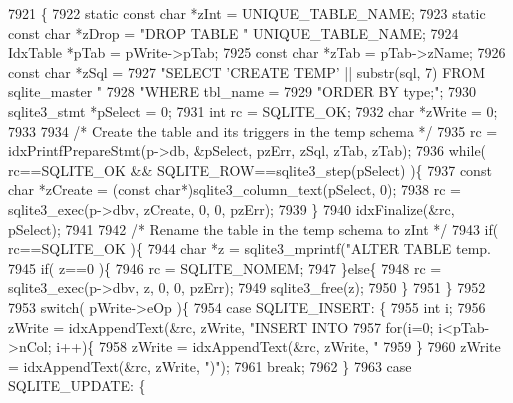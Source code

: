 \begin{DoxyCode}
7921  \{
7922   \textcolor{keyword}{static} \textcolor{keyword}{const} \textcolor{keywordtype}{char} *zInt = UNIQUE_TABLE_NAME;
7923   \textcolor{keyword}{static} \textcolor{keyword}{const} \textcolor{keywordtype}{char} *zDrop = \textcolor{stringliteral}{"DROP TABLE "} UNIQUE_TABLE_NAME;
7924   IdxTable *pTab = pWrite->pTab;
7925   \textcolor{keyword}{const} \textcolor{keywordtype}{char} *zTab = pTab->zName;
7926   \textcolor{keyword}{const} \textcolor{keywordtype}{char} *zSql = 
7927     \textcolor{stringliteral}{"SELECT 'CREATE TEMP' || substr(sql, 7) FROM sqlite\_master "}
7928     \textcolor{stringliteral}{"WHERE tbl\_name = %
7929     \textcolor{stringliteral}{"ORDER BY type;"};
7930   sqlite3_stmt *pSelect = 0;
7931   \textcolor{keywordtype}{int} rc = SQLITE_OK;
7932   \textcolor{keywordtype}{char} *zWrite = 0;
7933 
7934   \textcolor{comment}{/* Create the table and its triggers in the temp schema */}
7935   rc = idxPrintfPrepareStmt(p->db, &pSelect, pzErr, zSql, zTab, zTab);
7936   \textcolor{keywordflow}{while}( rc==SQLITE_OK && SQLITE_ROW==sqlite3_step(pSelect) )\{
7937     \textcolor{keyword}{const} \textcolor{keywordtype}{char} *zCreate = (\textcolor{keyword}{const} \textcolor{keywordtype}{char}*)sqlite3_column_text(pSelect, 0);
7938     rc = sqlite3_exec(p->dbv, zCreate, 0, 0, pzErr);
7939   \}
7940   idxFinalize(&rc, pSelect);
7941 
7942   \textcolor{comment}{/* Rename the table in the temp schema to zInt */}
7943   \textcolor{keywordflow}{if}( rc==SQLITE_OK )\{
7944     \textcolor{keywordtype}{char} *z = sqlite3_mprintf(\textcolor{stringliteral}{"ALTER TABLE temp.%
7945     \textcolor{keywordflow}{if}( z==0 )\{
7946       rc = SQLITE_NOMEM;
7947     \}\textcolor{keywordflow}{else}\{
7948       rc = sqlite3_exec(p->dbv, z, 0, 0, pzErr);
7949       sqlite3_free(z);
7950     \}
7951   \}
7952 
7953   \textcolor{keywordflow}{switch}( pWrite->eOp )\{
7954     \textcolor{keywordflow}{case} SQLITE_INSERT: \{
7955       \textcolor{keywordtype}{int} i;
7956       zWrite = idxAppendText(&rc, zWrite, \textcolor{stringliteral}{"INSERT INTO %
7957       \textcolor{keywordflow}{for}(i=0; i<pTab->nCol; i++)\{
7958         zWrite = idxAppendText(&rc, zWrite, \textcolor{stringliteral}{"%
7959       \}
7960       zWrite = idxAppendText(&rc, zWrite, \textcolor{stringliteral}{")"});
7961       \textcolor{keywordflow}{break};
7962     \}
7963     \textcolor{keywordflow}{case} SQLITE_UPDATE: \{
}}}}
\end{DoxyCode}
